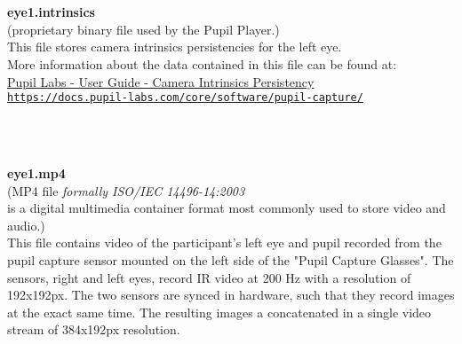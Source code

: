 \begin{description}
\begin{addmargin}[0em]{0em}
    \textbf{\\\\}
    \begin{addmargin}[1em]{0em} %
        \label{eye1.intrinsics}
        \textbf{eye1.intrinsics}\\(proprietary binary file used by the Pupil Player.)\\
        This file stores camera intrinsics persistencies for the left eye.\\
        More information about the data contained in this file can be found at:\\
        \href{https://docs.pupil-labs.com/core/software/pupil-capture/#camera-intrinsics-persistency}
        {{Pupil Labs - User Guide - Camera Intrinsics Persistency}\\\nolinkurl{https://docs.pupil-labs.com/core/software/pupil-capture/}}
    \end{addmargin} %

    \textbf{\\\\}
    \begin{addmargin}[1em]{0em} %
        \label{eye1.mp4}
        \textbf{eye1.mp4}\\
        (MP4 file \textit{formally ISO/IEC 14496-14:2003}\\
        is a digital multimedia container format most commonly used to store video and audio.)\\
        This file contains video of the participant's left eye and pupil recorded from the
        pupil capture sensor mounted on the left side of the "Pupil Capture Glasses".
        The sensors, right and left eyes, record IR video at 200 Hz with a resolution of 192x192px.
        The two sensors are synced in hardware, such that they record images at the exact same
        time. The resulting images a concatenated in a single video stream of 384x192px resolution.    
    \end{addmargin} %


\end{addmargin}
\end{description}
